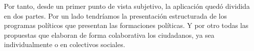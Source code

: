 Por tanto, desde un primer punto de vista subjetivo, la aplicación quedó dividida en dos partes. Por un lado tendríamos la presentación estructurada de los programas políticos que presentan las formaciones políticas. Y por otro todas las propuestas que elaboran de forma colaborativa los ciudadanos, ya sea individualmente o en colectivos sociales.



